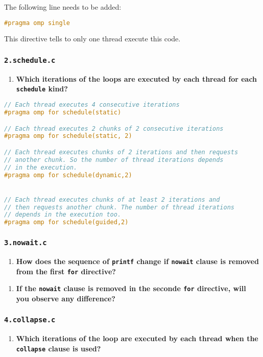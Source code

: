 \documentclass[a4paper]{article}
\begin{document}
The following line needs to be added:
\begin{lstlisting}[language=C]
#pragma omp single
\end{lstlisting}
This directive tells to only one thread execute this code.

\subsubsection{\texttt{2.schedule.c}}

\begin{enumerate}
	\item \textbf{Which iterations of the loops are executed by each thread for each \texttt{schedule} kind?}
\end{enumerate}

\begin{lstlisting}[language=C]
// Each thread executes 4 consecutive iterations
#pragma omp for schedule(static)

// Each thread executes 2 chunks of 2 consecutive iterations
#pragma omp for schedule(static, 2)

// Each thread executes chunks of 2 iterations and then requests 
// another chunk. So the number of thread iterations depends 
// in the execution.
#pragma omp for schedule(dynamic,2)


// Each thread executes chunks of at least 2 iterations and 
// then requests another chunk. The number of thread iterations 
// depends in the execution too.
#pragma omp for schedule(guided,2)
\end{lstlisting}

\subsubsection{\texttt{3.nowait.c}}

\begin{enumerate}
	\item \textbf{How does the sequence of \texttt{printf} change if \texttt{nowait} clause is removed from the first \texttt{for} directive?}
\end{enumerate}

\begin{enumerate}[resume]
	\item \textbf{If the \texttt{nowait} clause is removed in the seconde \texttt{for} directive, will you observe any difference?}
\end{enumerate}

\subsubsection{\texttt{4.collapse.c}}
\begin{enumerate}
	\item \textbf{Which iterations of the loop are executed by each thread when the \texttt{collapse} clause is used?}
\end{enumerate}
\end{document}
